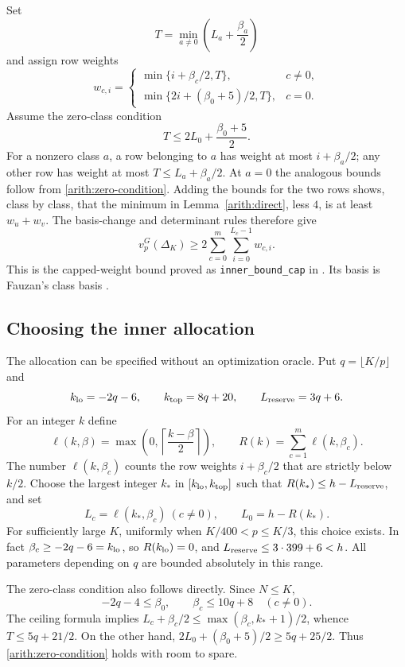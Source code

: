 Set
\[
 T=\min_{a\ne0}\left(L_a+\frac{\beta_a}{2}\right)
\]
and assign row weights
\begin{equation}\label{arith:innerweights}
 w_{c,i}=
 \begin{cases}
 \min\{i+\beta_c/2,T\},&c\ne0,\\
 \min\{2i+(\beta_0+5)/2,T\},&c=0.
 \end{cases}
\end{equation}
Assume the zero-class condition
\begin{equation}\label{arith:zero-condition}
 T\le2L_0+\frac{\beta_0+5}{2}.
\end{equation}
For a nonzero class $a$, a row belonging to $a$ has weight at most
$i+\beta_a/2$; any other row has weight at most
$T\le L_a+\beta_a/2$. At $a=0$ the analogous bounds follow from
\eqref{arith:zero-condition}. Adding the bounds for the two rows
shows, class by class, that the minimum in
Lemma~\ref{arith:direct}, less $4$, is at least $w_u+w_v$.
The basis-change and determinant rules therefore give
\begin{equation}\label{arith:inner}
 \boxed{\quad v_p^G(\Delta_K)\ge2\sum_{c=0}^m\sum_{i=0}^{L_c-1}w_{c,i}.\quad}
\end{equation}
This is the capped-weight bound proved as \texttt{inner\_bound\_cap}
in \cite[\texttt{InnerWeights.lean}]{firsching}. Its basis is
Fauzan's class basis \cite[\S4.1]{fauzan}.

\subsection{Choosing the inner allocation}

The allocation can be specified without an optimization oracle.
Put $q=\lfloor K/p\rfloor$ and
\[
 k_{\rm lo}=-2q-6,\qquad k_{\rm top}=8q+20,\qquad L_{\rm reserve}=3q+6.
\]
For an integer $k$ define
\[
 \ell(k,\beta)=\max\left(0,\left\lceil\frac{k-\beta}{2}\right\rceil\right),
 \qquad R(k)=\sum_{c=1}^m\ell(k,\beta_c).
\]
The number $\ell(k,\beta_c)$ counts the row weights
$i+\beta_c/2$ that are strictly below $k/2$.
Choose the largest integer $k_*$ in $[k_{\rm lo},k_{\rm top}]$
such that $R(k_*)\le h-L_{\rm reserve}$, and set
\[
 L_c=\ell(k_*,\beta_c)\ (c\ne0),\qquad L_0=h-R(k_*).
\]
For sufficiently large $K$, uniformly when $K/400<p\le K/3$,
this choice exists. In fact $\beta_c\ge-2q-6=k_{\rm lo}$, so
$R(k_{\rm lo})=0$, and $L_{\rm reserve}\le3\cdot399+6<h$.
All parameters depending on $q$ are bounded absolutely in this range.

The zero-class condition also follows directly. Since $N\le K$,
\[
 -2q-4\le\beta_0,\qquad
 \beta_c\le10q+8\quad(c\ne0).
\]
The ceiling formula implies
$L_c+\beta_c/2\le\max(\beta_c,k_*+1)/2$, whence
$T\le5q+21/2$.
On the other hand,
$2L_0+(\beta_0+5)/2\ge5q+25/2$.
Thus \eqref{arith:zero-condition} holds with room to spare.

